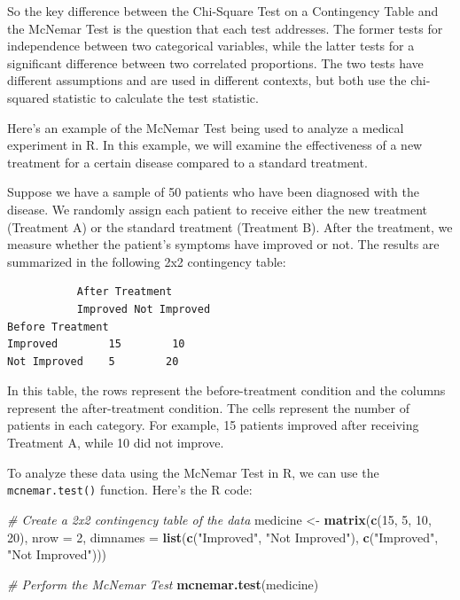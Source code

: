 \documentclass[
]{ctexart}
\newenvironment{Shaded}{\begin{snugshade}}{\end{snugshade}}
\newcommand{\AttributeTok}[1]{\textcolor[rgb]{0.13,0.29,0.53}{#1}}
\newcommand{\CommentTok}[1]{\textcolor[rgb]{0.56,0.35,0.01}{\textit{#1}}}
\newcommand{\DecValTok}[1]{\textcolor[rgb]{0.00,0.00,0.81}{#1}}
\newcommand{\FunctionTok}[1]{\textcolor[rgb]{0.13,0.29,0.53}{\textbf{#1}}}
\newcommand{\NormalTok}[1]{#1}
\newcommand{\OtherTok}[1]{\textcolor[rgb]{0.56,0.35,0.01}{#1}}
\newcommand{\StringTok}[1]{\textcolor[rgb]{0.31,0.60,0.02}{#1}}
\begin{document}
So the key difference between the Chi-Square Test on a Contingency Table
and the McNemar Test is the question that each test addresses. The
former tests for independence between two categorical variables, while
the latter tests for a significant difference between two correlated
proportions. The two tests have different assumptions and are used in
different contexts, but both use the chi-squared statistic to calculate
the test statistic.

Here's an example of the McNemar Test being used to analyze a medical
experiment in R. In this example, we will examine the effectiveness of a
new treatment for a certain disease compared to a standard treatment.

Suppose we have a sample of 50 patients who have been diagnosed with the
disease. We randomly assign each patient to receive either the new
treatment (Treatment A) or the standard treatment (Treatment B). After
the treatment, we measure whether the patient's symptoms have improved
or not. The results are summarized in the following 2x2 contingency
table:

\begin{verbatim}
           After Treatment
           Improved Not Improved
Before Treatment
Improved        15        10
Not Improved    5        20
\end{verbatim}

In this table, the rows represent the before-treatment condition and the
columns represent the after-treatment condition. The cells represent the
number of patients in each category. For example, 15 patients improved
after receiving Treatment A, while 10 did not improve.

To analyze these data using the McNemar Test in R, we can use the
\texttt{mcnemar.test()} function. Here's the R code:

\begin{Shaded}
\begin{Highlighting}[]
\CommentTok{\# Create a 2x2 contingency table of the data}
\NormalTok{medicine }\OtherTok{\textless{}{-}} \FunctionTok{matrix}\NormalTok{(}\FunctionTok{c}\NormalTok{(}\DecValTok{15}\NormalTok{, }\DecValTok{5}\NormalTok{, }\DecValTok{10}\NormalTok{, }\DecValTok{20}\NormalTok{), }
               \AttributeTok{nrow =} \DecValTok{2}\NormalTok{, }
               \AttributeTok{dimnames =} \FunctionTok{list}\NormalTok{(}\FunctionTok{c}\NormalTok{(}\StringTok{"Improved"}\NormalTok{, }\StringTok{"Not Improved"}\NormalTok{), }
                               \FunctionTok{c}\NormalTok{(}\StringTok{"Improved"}\NormalTok{, }\StringTok{"Not Improved"}\NormalTok{)))}

\CommentTok{\# Perform the McNemar Test}
\FunctionTok{mcnemar.test}\NormalTok{(medicine)}
\end{Highlighting}
\end{Shaded}
\end{document}

